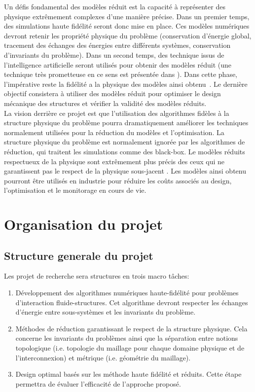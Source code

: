 \documentclass[french]{article}
\begin{document}
Un défis fondamental des modèles réduit est la capacité \`a représenter des physique extrêmement complexes d'une manière précise. 
Dans un premier temps, des simulations haute fidélité seront donc mise en place. Ces modèles numériques devront retenir les propriété physique du problème (conservation d'énergie global, tracement des échanges des énergies entre différents systèmes, conservation d'invariants du problème). Dans un second temps, des technique issus de l'intelligence artificielle seront utilisés pour obtenir des modèles réduit (une technique très prometteuse en ce sens est présentée dans \cite{lee2020}). Dans cette phase, l'impérative reste la fidélité a la physique des modèles ainsi obtenu~\cite{willcox2021}. Le dernière objectif consistera \`a utiliser des modèles réduit pour optimiser le design mécanique des structures et vérifier la validité des modèles réduits.\\

La vision derrière ce projet est que l'utilisation des algorithmes fidèles \`a la structure physique du problème pourra dramatiquement améliorer les techniques normalement utilisées pour la réduction du modèles et l'optimisation. La structure physique du problème est normalement ignorée par les algorithmes de réduction, qui traitent les simulations comme des black-box. Le modèles réduits respectueux de la physique sont extrêmement plus précis des ceux qui ne garantissent pas le respect de la physique sous-jacent \cite{lee2020}. Les modèles ainsi obtenu pourront être utilisés en industrie pour réduire les  co\^{u}ts associés au design, l'optimisation et le monitorage en cours de vie.

\section{Organisation du projet}

\subsection{Structure generale du projet}

Les projet de recherche sera structures en trois macro tâches:
\begin{enumerate}
	\item Développement des algorithmes numériques haute-fidélité pour problèmes d'interaction fluide-structures. Cet algorithme devront respecter les échanges d'énergie entre sous-systèmes et les invariants du problème.
	\item Méthodes de réduction garantissant le respect de la structure physique. Cela concerne les invariants du problèmes ainsi que la séparation entre notions topologique (i.e. topologie du maillage pour chaque domaine physique et  de l'interconnexion) et métrique (i.e. géométrie du maillage).
	\item Design optimal basés sur les méthode haute fidélité et réduits. Cette étape permettra de évaluer l'efficacit\'e de l'approche propos\'e.
\end{enumerate}
\end{document}
